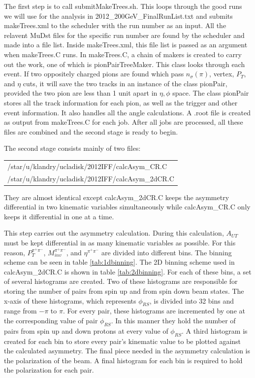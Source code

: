 \documentclass[letterpaper, abstract = on,listof=totoc, bibliography=totoc]{scrreprt}
\newcommand{\phirs}{\phi_{RS}}
\newcommand{\ptpair}{P_{T}^{\pi^+\pi^-}}
\newcommand{\mpair}{M_{inv}^{\pi^+\pi^-}}
\newcommand{\etapair}{\eta^{\pi^+\pi^-}}
\begin{document}
The first step is to call submitMakeTrees.sh. This loops through the good runs we will use for the analysis in 2012\_200GeV\_FinalRunList.txt and submits makeTrees.xml to the scheduler with the run number as an input. All the relavent MuDst files for the specific run number are found by the scheduler and made into a file list. Inside makeTrees.xml, this file list is passed as an argument when makeTrees.C runs. In makeTrees.C, a chain of makers is created to carry out the work, one of which is pionPairTreeMaker. This class looks through each event. If two oppositely charged pions are found which pass $n_\sigma(\pi)$, vertex, $P_T$, and $\eta$ cuts, it will save the two tracks in an instance of the class pionPair, provided the two pion are less than 1 unit apart in $\eta,\phi$ space. The class pionPair stores all the track information for each pion, as well as the trigger and other event information. It also handles all the angle calculations. A .root file is created as output from makeTrees.C for each job. After all jobs are processed, all these files are combined and the second stage is ready to begin. 

The second stage consists mainly of two files:
\begin{center}
\footnotesize
\begin{tabular}{l}
/star/u/klandry/ucladisk/2012IFF/calcAsym\_CR.C  \\
/star/u/klandry/ucladisk/2012IFF/calcAsym\_2dCR.C \\
\end{tabular}
\end{center}
They are almost identical except calcAsym\_2dCR.C keeps the asymmetry differential in two kinematic variables simultaneously while calcAsym\_CR.C only keeps it differential in one at a time. 

This step carries out the asymmetry calculation. During this calculation, $A_{UT}$ must be kept differential in as many kinematic variables as possible. For this reason, $\ptpair$, $\mpair$, and $\etapair$ are divided into different bins. The binning scheme can be seen in table \ref{tab:1dbinning}. The 2D binning scheme used in calcAsym\_2dCR.C is shown in table \ref{tab:2dbinning}. For each of these bins, a set of several histograms are created. Two of these histograms are responsible for storing the number of pairs from spin up and from spin down beam states. The x-axis of these histograms, which represents $\phirs$, is divided into 32 bins and range from $-\pi$ to $\pi$. For every pair, these histograms are incremented by one at the corresponding value of pair $\phirs$. In this manner they hold the number of pairs from spin up and down protons at every value of $\phirs$. A third histogram is created for each bin to store every pair's kinematic value to be plotted against the calculated asymmetry. The final piece needed in the asymmetry calculation is the polarization of the beam. A final histogram for each bin is required to hold the polarization for each pair. 
\end{document}
